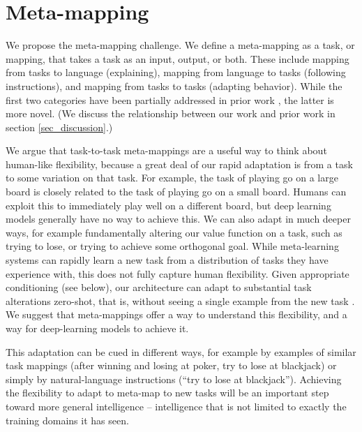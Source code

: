 \documentclass{article}
\begin{document}
\vspace{-0.25em}
\section{Meta-mapping}
\vspace{-0.5em} %
We propose the meta-mapping challenge. We define a meta-mapping as a task, or mapping, that takes a task as an input, output, or both. These include mapping from tasks to language (explaining), mapping from language to tasks (following instructions), and mapping from tasks to tasks (adapting behavior). While the first two categories have been partially addressed in prior work \citep[e.g.][]{Hermann2017, Co-Reyes2019}, the latter is more novel. (We discuss the relationship between our work and prior work in section \ref{sec_discussion}.) \par
We argue that task-to-task meta-mappings are a useful way to think about human-like flexibility, because a great deal of our rapid adaptation is from a task to some variation on that task. For example, the task of playing go on a large board is closely related to the task of playing go on a small board. Humans can exploit this to immediately play well on a different board, but deep learning models generally have no way to achieve this. We can also adapt in much deeper ways, for example fundamentally altering our value function on a task, such as trying to lose, or trying to achieve some orthogonal goal. While meta-learning systems can rapidly learn a new task from a distribution of tasks they have experience with, this does not fully capture human flexibility. Given appropriate conditioning (see below), our architecture can adapt to substantial task alterations zero-shot, that is, without seeing a single example from the new task \citep{Lake2016}. We suggest that meta-mappings offer a way to understand this flexibility, and a way for deep-learning models to achieve it.\par
This adaptation can be cued in different ways, for example by examples of similar task mappings (after winning and losing at poker, try to lose at blackjack) or simply by natural-language instructions (``try to lose at blackjack''). Achieving the flexibility to adapt to meta-map to new tasks will be an important step toward more general intelligence -- intelligence that is not limited to exactly the training domains it has seen. \par 

\vspace{-0.25em}
\end{document}
